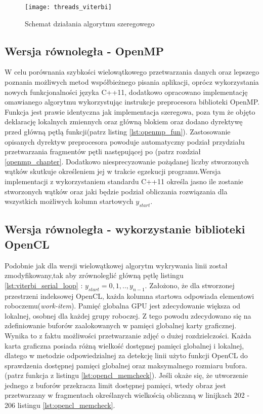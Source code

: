 \documentclass[document.tex]{subfiles}
\begin{document}
\begin{figure}[h]
\texttt{[image: threads\_viterbi]}
\caption{Schemat działania algorytmu szeregowego}
\label{fig:threads_viterbi}
\end{figure}
\clearpage
\subsection{Wersja równoległa - OpenMP}
\indent W celu porównania szybkości wielowątkowego przetwarzania danych oraz lepszego poznania
możliwych metod współbieżnego pisania aplikacji, oprócz wykorzystania nowych funkcjonalności języka C++11,
dodatkowo opracowano implementację omawianego algorytmu wykorzystując instrukcje preprocesora biblioteki 
OpenMP. Funkcja jest prawie identyczna jak implementacja szeregowa, poza tym że objęto deklarację lokalnych zmiennych oraz główną blokiem  oraz dodano dyrektywę  przed główną pętlą funkcji(patrz listing \ref{lst:openmp_fun}). Zastosowanie opisanych dyrektyw preprocesora powoduje automatyczny
podział przydziału przetwarzania fragmentów pętli następującej po (patrz rozdział \ref{openmp_chapter}. Dodatkowo niesprecyzowanie pożądanej liczby stworzonych wątków skutkuje określeniem jej
w trakcie egzekucji programu.\cite{openmp_guide}Wersja implementacji z wykorzystaniem standardu C++11 określa jasno ile zostanie stworzonych wątków oraz jaki będzie podział obliczania rozwiązania dla wszystkich możliwych kolumn startowych $y_{start}$.

 


\clearpage
\subsection{Wersja równoległa - wykorzystanie biblioteki OpenCL}\label{opencl_version}
\indent Podobnie jak dla wersji wielowątkowej algorytm wykrywania linii został zmodyfikowany,tak aby 
zrównoleglić główną pętlę listingu \ref{lst:viterbi_serial_loop} : $y_{start} = 0,1,.., y_{n-1}$.
Założono, że dla stworzonej przestrzeni indeksowej OpenCL, każda kolumna startowa odpowiada elementowi roboczemu(\textit{work-item}). 
\indent Pamięć globalna GPU jest zdecydowanie większa od lokalnej, osobnej dla każdej grupy roboczej.
Z tego powodu zdecydowano się na zdefiniowanie buforów zaalokowanych w pamięci globalnej karty graficznej.
Wynika to z faktu możliwości przetwarzanie zdjęć o dużej rozdzielczości. Każda karta graficzna posiada różną wielkość dostępnej pamięci globalnej i lokalnej, dlatego w metodzie  odpowiedzialnej za detekcję linii użyto funkcji OpenCL do sprawdzenia dostępnej pamięci globalnej oraz maksymalnego rozmiaru bufora.(patrz funkcja  z listingu \ref{lst:opencl_memcheck}). Jeśli okaże się, że
utworzenie jednego z buforów przekracza limit dostępnej pamięci, wtedy obraz jest przetwarzany w fragmentach
określanych wielkością  obliczaną w linijkach 202 - 206 listingu \ref{lst:opencl_memcheck}.
\end{document}
